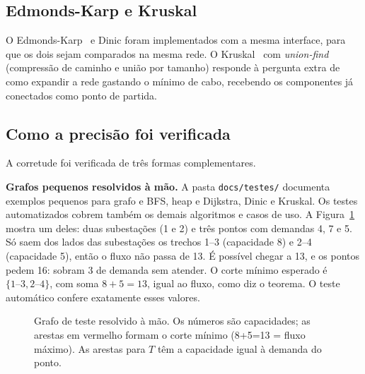 \documentclass[12pt]{article}
\begin{document}
\subsection{Edmonds-Karp e Kruskal}

O Edmonds-Karp~\cite{edmonds1972} e Dinic foram implementados com a mesma interface, para que os dois sejam comparados na mesma rede. O Kruskal~\cite{kruskal1956} com \emph{union-find} (compressão de caminho e união por tamanho) responde à pergunta extra de como expandir a rede gastando o mínimo de cabo, recebendo os componentes já conectados como ponto de partida.

\subsection{Como a precisão foi verificada}

A corretude foi verificada de três formas complementares.

\textbf{Grafos pequenos resolvidos à mão.} A pasta \texttt{docs/testes/} documenta exemplos pequenos para grafo e BFS, heap e Dijkstra, Dinic e Kruskal. Os testes automatizados cobrem também os demais algoritmos e casos de uso. A Figura~\ref{fig:exemplo} mostra um deles: duas subestações (1 e 2) e três pontos com demandas 4, 7 e 5. Só saem dos lados das subestações os trechos 1--3 (capacidade 8) e 2--4 (capacidade 5), então o fluxo não passa de 13. É possível chegar a 13, e os pontos pedem 16: sobram 3 de demanda sem atender. O corte mínimo esperado é $\{1\text{--}3, 2\text{--}4\}$, com soma $8+5=13$, igual ao fluxo, como diz o teorema. O teste automático confere exatamente esses valores.

\begin{figure}[ht]
\centering
{}
\caption{Grafo de teste resolvido à mão. Os números são capacidades; as arestas em vermelho formam o corte mínimo (8+5=13 = fluxo máximo). As arestas para $T$ têm a capacidade igual à demanda do ponto.}
\label{fig:exemplo}
\end{figure}
\end{document}
